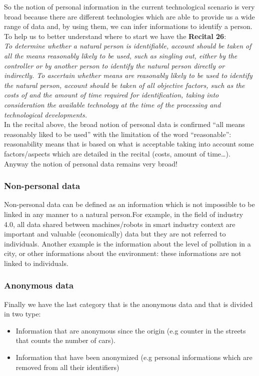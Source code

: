 So the notion of personal information in the current technological scenario is very broad because there are different technologies which are able to provide us a wide range of data and, by using them, we can infer informations to identify a person.
To help us to better understand where to start we have the \textbf{Recital 26}:\\
\textit{To determine whether a natural person is identifiable, account should be taken of all the means reasonably likely to be used, such as singling out, either by the controller or by another person to identify the natural person directly or indirectly. To ascertain whether means are reasonably likely to be used to identify the natural person, account should be taken of all objective factors, such as the costs of and the amount of time required for identification, taking into consideration the available technology at the time of the processing and technological developments.}\\
In the recital above, the broad notion of personal data is confirmed “all  means reasonably liked to be used” with the limitation of the word
“reasonable”: reasonability means that is based on what is acceptable taking into account some factors/aspects which are detailed in the recital (costs, amount of time…). Anyway the notion of personal data remains very broad!

\subsubsection{Non-personal data}
Non-personal data can be defined as an information which is not impossible to be linked in any manner to a natural person.For example, in the field of industry 4.0, all data shared between machines/robots in smart industry context are important and valuable (economically) data but they are not referred to individuals. Another example is the information about the level of pollution in a city, or other informations about the environment: these informations are not linked to individuals.

\subsubsection{Anonymous data}
Finally we have the last category that is the anonymous data and that is divided in two type:
\begin{itemize}
    \item Information that are anonymous since the origin (e.g counter in the streets that counts the number of cars).
    \item Information that have been anonymized (e.g personal informations which are removed from all their identifiers)
\end{itemize}

